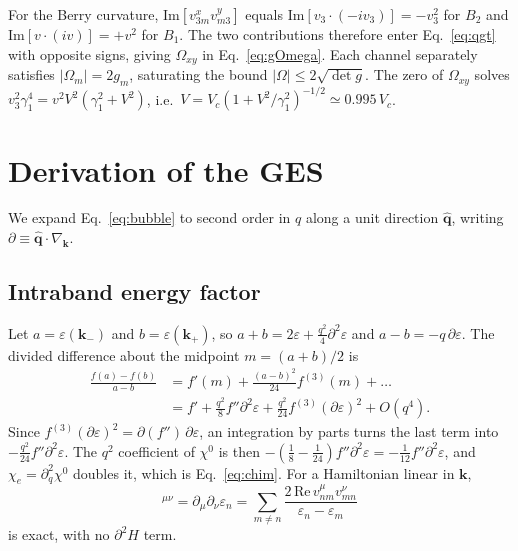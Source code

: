 \documentclass[12pt,a4paper]{article}
\newcommand{\bk}{\mathbf{k}}
\newcommand{\chie}{\chi_{e}}
\begin{document}
For the Berry curvature, $\mathrm{Im}[v^x_{3m}v^y_{m3}]$ equals $\mathrm{Im}[v_3\cdot(-iv_3)]=-v_3^2$ for $B_2$ and $\mathrm{Im}[v\cdot(iv)]=+v^2$ for $B_1$. The two contributions therefore enter Eq.~\eqref{eq:qgt} with opposite signs, giving $\Omega_{xy}$ in Eq.~\eqref{eq:gOmega}. Each channel separately satisfies $|\Omega_m|=2g_m$, saturating the bound $|\Omega|\le2\sqrt{\det g}$. The zero of $\Omega_{xy}$ solves $v_3^2\gamma_1^4=v^2V^2(\gamma_1^2+V^2)$, i.e.\ $V=V_c(1+V^2/\gamma_1^2)^{-1/2}\simeq0.995\,V_c$.

\section{Derivation of the GES}\label{app:ges}

We expand Eq.~\eqref{eq:bubble} to second order in $q$ along a unit direction $\hat{\mathbf q}$, writing $\partial\equiv\hat{\mathbf q}\cdot\nabla_{\bk}$.

\subsection{Intraband energy factor}

Let $a=\varepsilon(\bk_-)$ and $b=\varepsilon(\bk_+)$, so $a+b=2\varepsilon+\tfrac{q^2}{4}\partial^2\varepsilon$ and $a-b=-q\,\partial\varepsilon$. The divided difference about the midpoint $m=(a+b)/2$ is
\begin{align}
\frac{f(a)-f(b)}{a-b}&=f'(m)+\frac{(a-b)^2}{24}f^{(3)}(m)+\dots\nonumber\\
&=f'+\frac{q^2}{8}f''\partial^2\varepsilon+\frac{q^2}{24}f^{(3)}(\partial\varepsilon)^2+O(q^4).
\end{align}
Since $f^{(3)}(\partial\varepsilon)^2=\partial(f'')\,\partial\varepsilon$, an integration by parts turns the last term into $-\tfrac{q^2}{24}f''\partial^2\varepsilon$. The $q^2$ coefficient of $\chi^0$ is then $-(\tfrac18-\tfrac1{24})f''\partial^2\varepsilon=-\tfrac1{12}f''\partial^2\varepsilon$, and $\chie=\partial_q^2\chi^0$ doubles it, which is Eq.~\eqref{eq:chim}. For a Hamiltonian linear in $\bk$,
\begin{equation}
[m_n^{-1}]^{\mu\nu}=\partial_\mu\partial_\nu\varepsilon_n=\sum_{m\neq n}\frac{2\,\mathrm{Re}\,v^\mu_{nm}v^\nu_{mn}}{\varepsilon_n-\varepsilon_m}
\end{equation}
is exact, with no $\partial^2H$ term.
\end{document}
